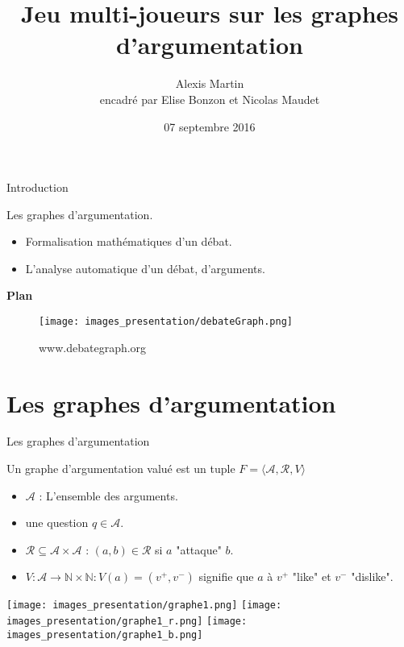 \documentclass{beamer}
\title{Jeu multi-joueurs sur les graphes d'argumentation}
\author{Alexis Martin\\encadré par Elise Bonzon et Nicolas Maudet}
\date{07 septembre 2016}
\begin{document}
  \begin{frame}
    \titlepage
  \end{frame}

    \begin{frame}{Introduction}
      \noindent
     \begin{minipage}[c]{.46\linewidth}
       Les graphes d'argumentation.
        \begin{itemize}
          \item Formalisation mathématiques d'un débat.
          \item L'analyse automatique d'un débat, d'arguments.
        \end{itemize}
        \vspace{1em}

        \textbf{Plan}
        \vspace{0.3em}
        \tableofcontents
     \end{minipage} \hfill
     \begin{minipage}[c]{.5\linewidth}
       \begin{figure}
        \texttt{[image: images\_presentation/debateGraph.png]}
          \caption{www.debategraph.org}
        \end{figure}
     \end{minipage}
    \end{frame}

  \section{Les graphes d'argumentation}
  \begin{frame}{Les graphes d'argumentation}
      \noindent
     \begin{minipage}[c]{.6\linewidth}
       Un graphe d'argumentation valué est un tuple $F = \langle \mathcal{A}, \mathcal{R}, V \rangle$
       \begin{itemize}
         \item $\mathcal{A}$ : L'ensemble des arguments.
         \item une question $q \in \mathcal{A}$.
         \item $\mathcal{R} \subseteq \mathcal{A} \times \mathcal{A}$ : $(a,b) \in \mathcal{R}$ si $a$ "attaque" $b$.
         \item $V: \mathcal{A} \rightarrow \mathbb{N} \times \mathbb{N} : V(a) = (v^+, v^-)$ signifie que $a$ à $v^+$ "like" et $v^-$ "dislike".
       \end{itemize}
     \end{minipage} \hfill
     \begin{minipage}[c]{.35\linewidth}
       \begin{overprint}
         \texttt{[image: images\_presentation/graphe1.png]}
         \texttt{[image: images\_presentation/graphe1\_r.png]}
         \texttt{[image: images\_presentation/graphe1\_b.png]}
       \end{overprint}
     \end{minipage}
  \end{frame}
\end{document}
